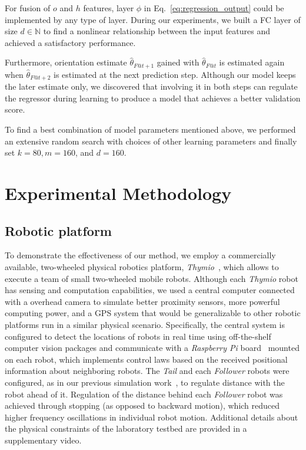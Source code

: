 \documentclass[letterpaper, 10 pt, conference]{ieeeconf}  %
\begin{document}
\begin{itemize}
            For fusion of $o$ and $h$ features, layer $\phi$ in
            Eq.~\eqref{eq:regression_output} could be implemented by any
            type of layer. During our experiments, we built a FC layer
            of size $d \in \mathbb{N}$ to find a nonlinear relationship
            between the input features and achieved a satisfactory
            performance.

            Furthermore, orientation estimate $\hat{\theta}_{F@t+1}$
            gained with $\hat{\theta}_{F@t}$ is estimated again when
            $\hat{\theta}_{F@t+2}$ is estimated at the next prediction
            step. Although our model keeps the later estimate only, we
            discovered that involving it in both steps can regulate the
            regressor during learning to produce a model that achieves a
            better validation score.

    \end{itemize}
    To find a best combination of model parameters mentioned above, we
    performed an extensive random search with choices of other learning
    parameters and finally set $k=80, m=160$, and $d=160$.

	\section{Experimental Methodology}
	\label{sec:experiments}

    \subsection{Robotic platform}

    To demonstrate the effectiveness of our method, we employ a
    commercially available, two-wheeled physical robotics platform,
    \emph{Thymio}~\cite{Shin14}, which allows to execute a team of small
    two-wheeled mobile robots. Although each \emph{Thymio} robot has
    sensing and computation capabilities, we used a central computer
    connected with a overhead camera to simulate better proximity
    sensors, more powerful computing power, and a GPS system that would
    be generalizable to other robotic platforms run in a similar
    physical scenario. Specifically, the central system is configured to
    detect the locations of robots in real time using off-the-shelf
    computer vision packages and communicate with a \emph{Raspberry Pi}
    board~\cite{Upton14} mounted on each robot, which implements control
    laws based on the received positional information about neighboring
    robots. The \emph{Tail} and each \emph{Follower} robots were
    configured, as in our previous simulation work~\cite{CPR17}, to
    regulate distance with the robot ahead of it. Regulation of the
    distance behind each \emph{Follower} robot was achieved through
    stopping (as opposed to backward motion), which reduced higher
    frequency oscillations in individual robot motion. Additional
    details about the physical constraints of the laboratory testbed are
    provided in a supplementary video.
	
\end{document}
